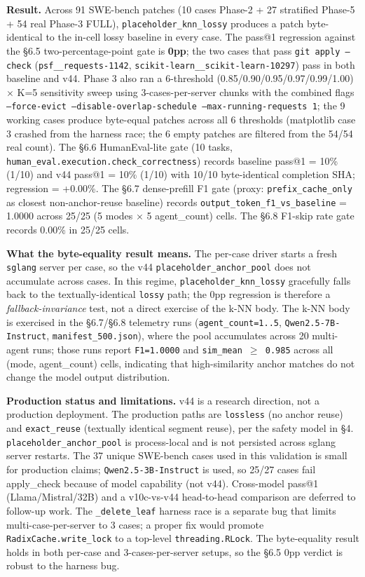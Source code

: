 \textbf{Result.} Across 91 SWE-bench patches (10 cases Phase-2 + 27 stratified Phase-5 + 54 real Phase-3 FULL), \texttt{placeholder\_knn\_lossy} produces a patch byte-identical to the in-cell lossy baseline in every case. The pass@1 regression against the §6.5 two-percentage-point gate is \textbf{0pp}; the two cases that pass \texttt{git apply --check} (\texttt{psf\_\_requests-1142}, \texttt{scikit-learn\_\_scikit-learn-10297}) pass in both baseline and v44. Phase 3 also ran a 6-threshold (0.85/0.90/0.95/0.97/0.99/1.00) $\times$ K=5 sensitivity sweep using 3-cases-per-server chunks with the combined flags \texttt{--force-evict --disable-overlap-schedule --max-running-requests 1}; the 9 working cases produce byte-equal patches across all 6 thresholds (matplotlib case 3 crashed from the harness race; the 6 empty patches are filtered from the 54/54 real count). The §6.6 HumanEval-lite gate (10 tasks, \texttt{human\_eval.execution.check\_correctness}) records baseline pass@1 = 10\% (1/10) and v44 pass@1 = 10\% (1/10) with 10/10 byte-identical completion SHA; regression = +0.00\%. The §6.7 dense-prefill F1 gate (proxy: \texttt{prefix\_cache\_only} as closest non-anchor-reuse baseline) records \texttt{output\_token\_f1\_vs\_baseline} = 1.0000 across 25/25 (5 modes $\times$ 5 agent\_count) cells. The §6.8 F1-skip rate gate records 0.00\% in 25/25 cells.

\textbf{What the byte-equality result means.} The per-case driver starts a fresh \texttt{sglang} server per case, so the v44 \texttt{placeholder\_anchor\_pool} does not accumulate across cases. In this regime, \texttt{placeholder\_knn\_lossy} gracefully falls back to the textually-identical \texttt{lossy} path; the 0pp regression is therefore a \emph{fallback-invariance} test, not a direct exercise of the k-NN body. The k-NN body is exercised in the §6.7/§6.8 telemetry runs (\texttt{agent\_count=1..5}, \texttt{Qwen2.5-7B-Instruct}, \texttt{manifest\_500.json}), where the pool accumulates across 20 multi-agent runs; those runs report \texttt{F1=1.0000} and \texttt{sim\_mean $\geq$ 0.985} across all (mode, agent\_count) cells, indicating that high-similarity anchor matches do not change the model output distribution.

\textbf{Production status and limitations.} v44 is a research direction, not a production deployment. The production paths are \texttt{lossless} (no anchor reuse) and \texttt{exact\_reuse} (textually identical segment reuse), per the safety model in \S4. \texttt{placeholder\_anchor\_pool} is process-local and is not persisted across sglang server restarts. The 37 unique SWE-bench cases used in this validation is small for production claims; \texttt{Qwen2.5-3B-Instruct} is used, so 25/27 cases fail apply\_check because of model capability (not v44). Cross-model pass@1 (Llama/Mistral/32B) and a v10c-vs-v44 head-to-head comparison are deferred to follow-up work. The \texttt{\_delete\_leaf} harness race is a separate bug that limits multi-case-per-server to 3 cases; a proper fix would promote \texttt{RadixCache.write\_lock} to a top-level \texttt{threading.RLock}. The byte-equality result holds in both per-case and 3-cases-per-server setups, so the §6.5 0pp verdict is robust to the harness bug.


